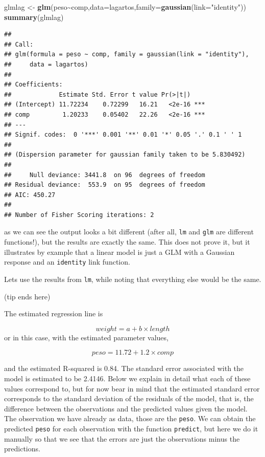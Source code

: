 \documentclass[
]{book}
\newenvironment{Shaded}{\begin{snugshade}}{\end{snugshade}}
\newcommand{\AttributeTok}[1]{\textcolor[rgb]{0.13,0.29,0.53}{#1}}
\newcommand{\FunctionTok}[1]{\textcolor[rgb]{0.13,0.29,0.53}{\textbf{#1}}}
\newcommand{\NormalTok}[1]{#1}
\newcommand{\OtherTok}[1]{\textcolor[rgb]{0.56,0.35,0.01}{#1}}
\newcommand{\SpecialCharTok}[1]{\textcolor[rgb]{0.81,0.36,0.00}{\textbf{#1}}}
\newcommand{\StringTok}[1]{\textcolor[rgb]{0.31,0.60,0.02}{#1}}
\begin{document}
\begin{Shaded}
\begin{Highlighting}[]
\NormalTok{glmlag }\OtherTok{\textless{}{-}} \FunctionTok{glm}\NormalTok{(peso}\SpecialCharTok{\textasciitilde{}}\NormalTok{comp,}\AttributeTok{data=}\NormalTok{lagartos,}\AttributeTok{family=}\FunctionTok{gaussian}\NormalTok{(}\AttributeTok{link=}\StringTok{"identity"}\NormalTok{))}
\FunctionTok{summary}\NormalTok{(glmlag)}
\end{Highlighting}
\end{Shaded}

\begin{verbatim}
## 
## Call:
## glm(formula = peso ~ comp, family = gaussian(link = "identity"), 
##     data = lagartos)
## 
## Coefficients:
##             Estimate Std. Error t value Pr(>|t|)    
## (Intercept) 11.72234    0.72299   16.21   <2e-16 ***
## comp         1.20233    0.05402   22.26   <2e-16 ***
## ---
## Signif. codes:  0 '***' 0.001 '**' 0.01 '*' 0.05 '.' 0.1 ' ' 1
## 
## (Dispersion parameter for gaussian family taken to be 5.830492)
## 
##     Null deviance: 3441.8  on 96  degrees of freedom
## Residual deviance:  553.9  on 95  degrees of freedom
## AIC: 450.27
## 
## Number of Fisher Scoring iterations: 2
\end{verbatim}

as we can see the output looks a bit different (after all, \texttt{lm} and \texttt{glm} are different functions!), but the results are exactly the same. This does not prove it, but it illustrates by example that a linear model is just a GLM with a Gaussian response and an \texttt{identity} link function.

Lets use the results from \texttt{lm}, while noting that everything else would be the same.

(tip ends here)

The estimated regression line is

\[weight= a+b \times length\]
or in this case, with the estimated parameter values,

\[ peso =11.72 +1.2 \times comp \]

and the estimated R-squared is 0.84. The standard error associated with the model is estimated to be 2.4146. Below we explain in detail what each of these values correspond to, but for now bear in mind that the estimated standard error corresponds to the standard deviation of the residuals of the model, that is, the difference between the observations and the predicted values given the model. The observation we have already as data, those are the \texttt{peso}. We can obtain the predicted \texttt{peso} for each observation with the function \texttt{predict}, but here we do it manually so that we see that the errors are just the observations minus the predictions.
\end{document}
